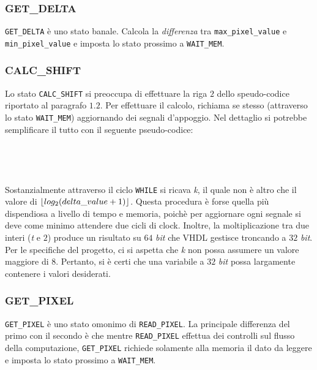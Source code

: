 \documentclass[11pt, a4paper]{article}
\DeclarePairedDelimiter\floor{\lfloor}{\rfloor}
\begin{document}
\subsubsection{GET\_DELTA}
\texttt{GET\_DELTA} è uno stato banale. Calcola la \textit{differenza} tra \texttt{max\_pixel\_value} e \texttt{min\_pixel\_value} e imposta lo stato prossimo a \texttt{WAIT\_MEM}.

\pagebreak

\subsubsection{CALC\_SHIFT}
Lo stato \texttt{CALC\_SHIFT} si preoccupa di effettuare la riga $2$ dello speudo-codice riportato al paragrafo $1.2$.
Per effettuare il calcolo, richiama se stesso (attraverso lo stato \texttt{WAIT\_MEM}) aggiornando dei segnali d'appoggio. Nel dettaglio si potrebbe semplificare il tutto con il seguente pseudo-codice:
\\
\\
\noindent{}
\\
\\
\\
Sostanzialmente attraverso il ciclo \texttt{WHILE} si ricava \textit{k}, il quale non è altro che il valore di $\floor{log_2(delta\_value +1)}$. Questa procedura è forse quella più dispendiosa a livello di tempo e memoria, poichè per aggiornare ogni segnale si deve come minimo attendere due cicli di clock. Inoltre, la moltiplicazione tra due interi (\textit{t} e $2$) produce un risultato su $64$ \textit{bit} che VHDL gestisce troncando a $32$ \textit{bit}. Per le specifiche del progetto, ci si aspetta che \textit{k} non possa assumere un valore maggiore di $8$. Pertanto, si è certi che una variabile a $32$ \textit{bit} possa largamente contenere i valori desiderati.

\subsubsection{GET\_PIXEL}
\texttt{GET\_PIXEL} è uno stato omonimo di \texttt{READ\_PIXEL}. La principale differenza del primo con il secondo è che mentre \texttt{READ\_PIXEL} effettua dei controlli sul flusso della computazione, \texttt{GET\_PIXEL} richiede solamente alla memoria il dato da leggere e imposta lo stato prossimo a \texttt{WAIT\_MEM}.
\end{document}
